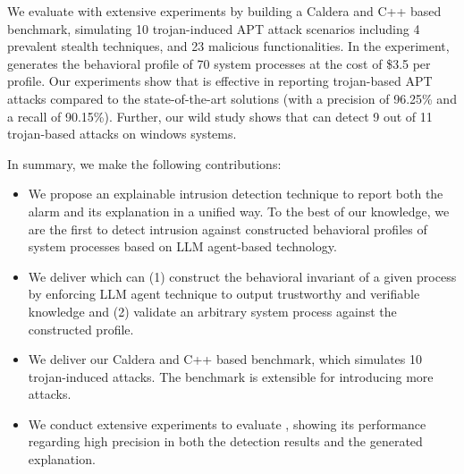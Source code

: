 We evaluate \tool with extensive experiments by building a Caldera\cite{caldera} and C++ based benchmark,
simulating 10 trojan-induced APT attack scenarios including 
4 prevalent stealth techniques, 
and 23 malicious functionalities.
In the experiment, \tool generates the behavioral profile of 70 system processes
at the cost of \$3.5 per profile.
Our experiments show that 
\tool is effective in reporting trojan-based APT attacks compared to the state-of-the-art solutions (with a precision of 96.25\% and a recall of 90.15\%).
Further, our wild study shows that \tool can detect 9 out of 11 trojan-based attacks on windows systems.

In summary, we make the following contributions:
\begin{itemize}[leftmargin=*]
  \item We propose an explainable intrusion detection technique \tool to report both the alarm and its explanation in a unified way. 
      To the best of our knowledge, we are the first to detect intrusion against constructed behavioral profiles of system processes based on LLM agent-based technology.
  \item We deliver \tool which can 
    (1) construct the behavioral invariant of a given process by enforcing LLM agent technique to output trustworthy and verifiable knowledge and
    (2) validate an arbitrary system process against the constructed profile.
  \item We deliver our Caldera and C++ based benchmark, which simulates 10 trojan-induced attacks. 
    The benchmark is extensible for introducing more attacks.
  \item We conduct extensive experiments to evaluate \tool, showing its performance regarding high precision in both the detection results and the generated explanation.
\end{itemize}
 